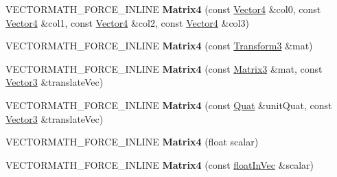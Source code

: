 \begin{DoxyCompactItemize}
\item 
\mbox{\label{classVectormath_1_1Aos_1_1Matrix4_af3386f64d6e060f56a9cc5597d634f83}} 
V\+E\+C\+T\+O\+R\+M\+A\+T\+H\+\_\+\+F\+O\+R\+C\+E\+\_\+\+I\+N\+L\+I\+NE {\bfseries Matrix4} (const \hyperlink{classVectormath_1_1Aos_1_1Vector4}{Vector4} \&col0, const \hyperlink{classVectormath_1_1Aos_1_1Vector4}{Vector4} \&col1, const \hyperlink{classVectormath_1_1Aos_1_1Vector4}{Vector4} \&col2, const \hyperlink{classVectormath_1_1Aos_1_1Vector4}{Vector4} \&col3)
\item 
\mbox{\label{classVectormath_1_1Aos_1_1Matrix4_a155dbd37559971bfcd30124bf5b66b5b}} 
V\+E\+C\+T\+O\+R\+M\+A\+T\+H\+\_\+\+F\+O\+R\+C\+E\+\_\+\+I\+N\+L\+I\+NE {\bfseries Matrix4} (const \hyperlink{classVectormath_1_1Aos_1_1Transform3}{Transform3} \&mat)
\item 
\mbox{\label{classVectormath_1_1Aos_1_1Matrix4_a136146577c4e69585bde9e17fd7739fd}} 
V\+E\+C\+T\+O\+R\+M\+A\+T\+H\+\_\+\+F\+O\+R\+C\+E\+\_\+\+I\+N\+L\+I\+NE {\bfseries Matrix4} (const \hyperlink{classVectormath_1_1Aos_1_1Matrix3}{Matrix3} \&mat, const \hyperlink{classVectormath_1_1Aos_1_1Vector3}{Vector3} \&translate\+Vec)
\item 
\mbox{\label{classVectormath_1_1Aos_1_1Matrix4_ac3baa078bb8fc98ffc65cc32c36c5e6e}} 
V\+E\+C\+T\+O\+R\+M\+A\+T\+H\+\_\+\+F\+O\+R\+C\+E\+\_\+\+I\+N\+L\+I\+NE {\bfseries Matrix4} (const \hyperlink{classVectormath_1_1Aos_1_1Quat}{Quat} \&unit\+Quat, const \hyperlink{classVectormath_1_1Aos_1_1Vector3}{Vector3} \&translate\+Vec)
\item 
\mbox{\label{classVectormath_1_1Aos_1_1Matrix4_ab38c1cbd9bacd23df03ac5ed70755d2f}} 
V\+E\+C\+T\+O\+R\+M\+A\+T\+H\+\_\+\+F\+O\+R\+C\+E\+\_\+\+I\+N\+L\+I\+NE {\bfseries Matrix4} (float scalar)
\item 
\mbox{\label{classVectormath_1_1Aos_1_1Matrix4_aa60ecfaef86b53ff416286fa73813baa}} 
V\+E\+C\+T\+O\+R\+M\+A\+T\+H\+\_\+\+F\+O\+R\+C\+E\+\_\+\+I\+N\+L\+I\+NE {\bfseries Matrix4} (const \hyperlink{classVectormath_1_1floatInVec}{float\+In\+Vec} \&scalar)
\item 

\end{DoxyCompactItemize}
